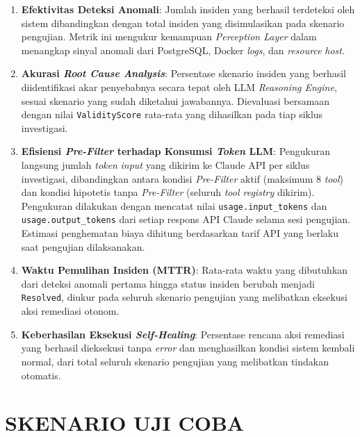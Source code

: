 \begin{enumerate}[label=\arabic*., leftmargin=*]
  \item \textbf{Efektivitas Deteksi Anomali}: Jumlah insiden yang berhasil terdeteksi oleh sistem dibandingkan dengan total insiden yang disimulasikan pada skenario pengujian. Metrik ini mengukur kemampuan \textit{Perception Layer} dalam menangkap sinyal anomali dari PostgreSQL, Docker \textit{logs}, dan \textit{resource} \textit{host}.

  \item \textbf{Akurasi \textit{Root Cause Analysis}}: Persentase skenario insiden yang berhasil diidentifikasi akar penyebabnya secara tepat oleh LLM \textit{Reasoning Engine}, sesuai skenario yang sudah diketahui jawabannya. Dievaluasi bersamaan dengan nilai \texttt{ValidityScore} rata-rata yang dihasilkan pada tiap siklus investigasi.

  \item \textbf{Efisiensi \textit{Pre-Filter} terhadap Konsumsi \textit{Token} LLM}: Pengukuran langsung jumlah \textit{token} \textit{input} yang dikirim ke Claude API per siklus investigasi, dibandingkan antara kondisi \textit{Pre-Filter} aktif (maksimum 8 \textit{tool}) dan kondisi hipotetis tanpa \textit{Pre-Filter} (seluruh \textit{tool registry} dikirim). Pengukuran dilakukan dengan mencatat nilai \texttt{usage.input\_tokens} dan \texttt{usage.output\_tokens} dari setiap respons API Claude selama sesi pengujian. Estimasi penghematan biaya dihitung berdasarkan tarif API yang berlaku saat pengujian dilaksanakan.

  \item \textbf{Waktu Pemulihan Insiden (MTTR)}: Rata-rata waktu yang dibutuhkan dari deteksi anomali pertama hingga status insiden berubah menjadi \texttt{Resolved}, diukur pada seluruh skenario pengujian yang melibatkan eksekusi aksi remediasi otonom.

  \item \textbf{Keberhasilan Eksekusi \textit{Self-Healing}}: Persentase rencana aksi remediasi yang berhasil dieksekusi tanpa \textit{error} dan menghasilkan kondisi sistem kembali normal, dari total seluruh skenario pengujian yang melibatkan tindakan otomatis.
\end{enumerate}

\section{SKENARIO UJI COBA}

